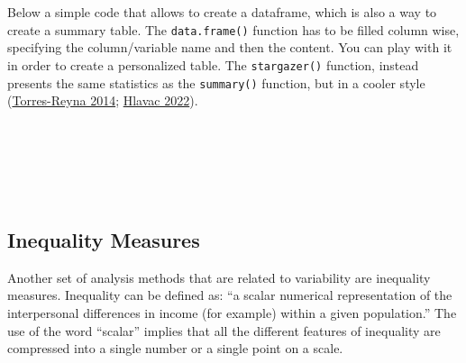 \documentclass[
]{article}
\newenvironment{Shaded}{\begin{snugshade}}{\end{snugshade}}
\newcommand{\AttributeTok}[1]{\textcolor[rgb]{0.13,0.29,0.53}{#1}}
\newcommand{\CommentTok}[1]{\textcolor[rgb]{0.56,0.35,0.01}{\textit{#1}}}
\newcommand{\DecValTok}[1]{\textcolor[rgb]{0.00,0.00,0.81}{#1}}
\newcommand{\FunctionTok}[1]{\textcolor[rgb]{0.13,0.29,0.53}{\textbf{#1}}}
\newcommand{\NormalTok}[1]{#1}
\newcommand{\SpecialCharTok}[1]{\textcolor[rgb]{0.81,0.36,0.00}{\textbf{#1}}}
\newcommand{\StringTok}[1]{\textcolor[rgb]{0.31,0.60,0.02}{#1}}
\begin{document}
Below a simple code that allows to create a dataframe, which is also a
way to create a summary table. The \texttt{data.frame()} function has to be
filled column wise, specifying the column/variable name and then the
content. You can play with it in order to create a personalized table.
The \texttt{stargazer()} function, instead presents the same statistics as the
\texttt{summary()} function, but in a cooler style (\protect\hyperlink{ref-torres-reyna2014}{Torres-Reyna 2014}; \protect\hyperlink{ref-hlavac2022}{Hlavac 2022}).

\begin{Shaded}
\end{Shaded}

~

~

~

\hypertarget{inequality-measures}{%
\subsection{Inequality Measures}\label{inequality-measures}}

Another set of analysis methods that are related to variability are
inequality measures. Inequality can be defined as: ``a scalar numerical
representation of the interpersonal differences in income (for example)
within a given population.'' The use of the word ``scalar'' implies that
all the different features of inequality are compressed into a single
number or a single point on a scale.
\end{document}
